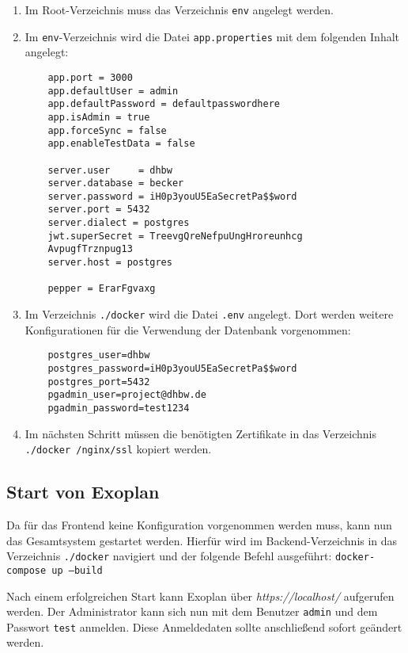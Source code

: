 \begin{enumerate}
	\item Im Root-Verzeichnis muss das Verzeichnis \texttt{env} angelegt werden.
	\item Im \texttt{env}-Verzeichnis wird die Datei \texttt{app.properties} mit dem folgenden Inhalt angelegt:
	\begin{lstlisting}
	app.port = 3000
	app.defaultUser = admin
	app.defaultPassword = defaultpasswordhere
	app.isAdmin = true
	app.forceSync = false
	app.enableTestData = false
	
	server.user     = dhbw
	server.database = becker
	server.password = iH0p3youU5EaSecretPa$$word
	server.port = 5432
	server.dialect = postgres
	jwt.superSecret = TreevgQreNefpuUngHroreunhcg
	AvpugfTrznpug13
	server.host = postgres
	
	pepper = ErarFgvaxg
	\end{lstlisting}
	
	\item Im Verzeichnis \texttt{./docker} wird die Datei \texttt{.env} angelegt. Dort werden weitere Konfigurationen für die Verwendung der Datenbank vorgenommen:
	
	\begin{lstlisting}
	postgres_user=dhbw
	postgres_password=iH0p3youU5EaSecretPa$$word
	postgres_port=5432
	pgadmin_user=project@dhbw.de
	pgadmin_password=test1234
	\end{lstlisting}
	
	\item Im nächsten Schritt müssen die benötigten Zertifikate in das Verzeichnis \texttt{./docker
		/nginx/ssl} kopiert werden.
	
\end{enumerate}

\subsection{Start von Exoplan}

Da für das Frontend keine Konfiguration vorgenommen werden muss, kann nun das  Gesamtsystem gestartet werden. Hierfür wird im Backend-Verzeichnis in das Verzeichnis \texttt{./docker} navigiert und der folgende Befehl ausgeführt: \texttt{docker-compose up --build}

Nach einem erfolgreichen Start kann Exoplan über \textit{https://localhost/} aufgerufen werden. Der Administrator kann sich nun mit dem Benutzer \texttt{admin} und dem Passwort \texttt{test} anmelden. Diese Anmeldedaten sollte anschließend sofort geändert werden.

